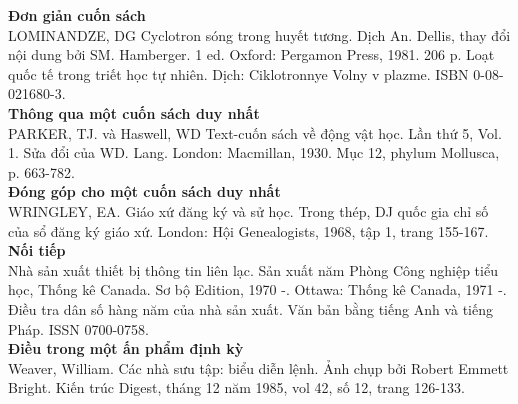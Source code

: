 \documentclass{hcmutarticle}
\begin{document}
\textbf{Đơn giản cuốn sách}\\
LOMINANDZE, DG Cyclotron sóng trong huyết tương. Dịch An. Dellis, thay đổi nội dung bởi SM. Hamberger. 1 ed. Oxford: Pergamon Press, 1981. 206 p. Loạt quốc tế trong triết học tự nhiên. Dịch: Ciklotronnye Volny v plazme. ISBN 0-08-021680-3.\\
\textbf{Thông qua một cuốn sách duy nhất}\\
PARKER, TJ. và Haswell, WD Text-cuốn sách về động vật học. Lần thứ 5, Vol. 1. Sửa đổi của WD. Lang. London: Macmillan, 1930. Mục 12, phylum Mollusca, p. 663-782.\\
\textbf{Đóng góp cho một cuốn sách duy nhất}\\
WRINGLEY, EA. Giáo xứ đăng ký và sử học. Trong thép, DJ quốc gia chỉ số của sổ đăng ký giáo xứ. London: Hội Genealogists, 1968, tập 1, trang 155-167.\\
\textbf{Nối tiếp}\\
Nhà sản xuất thiết bị thông tin liên lạc. Sản xuất năm Phòng Công nghiệp tiểu học, Thống kê Canada. Sơ bộ Edition, 1970 -. Ottawa: Thống kê Canada, 1971 -. Điều tra dân số hàng năm của nhà sản xuất. Văn bản bằng tiếng Anh và tiếng Pháp. ISSN 0700-0758.\\
\textbf{Điều trong một ấn phẩm định kỳ}\\
Weaver, William. Các nhà sưu tập: biểu diễn lệnh. Ảnh chụp bởi Robert Emmett Bright. Kiến trúc Digest, tháng 12 năm 1985, vol 42, số 12, trang 126-133.
\end{document}
